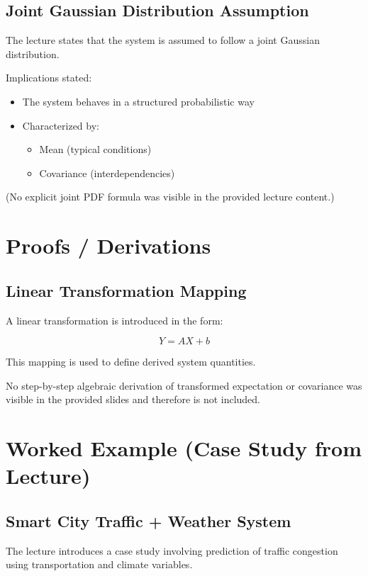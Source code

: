 \documentclass[12pt]{article}
\begin{document}
\subsection*{Joint Gaussian Distribution Assumption}

The lecture states that the system is assumed to follow a joint Gaussian distribution.

Implications stated:

\begin{itemize}
\item The system behaves in a structured probabilistic way
\item Characterized by:
\begin{itemize}
\item Mean (typical conditions)
\item Covariance (interdependencies)
\end{itemize}
\end{itemize}

(No explicit joint PDF formula was visible in the provided lecture content.)

\section*{Proofs / Derivations}

\subsection*{Linear Transformation Mapping}

A linear transformation is introduced in the form:

\[
Y = AX + b
\]

This mapping is used to define derived system quantities.

No step-by-step algebraic derivation of transformed expectation or covariance was visible in the provided slides and therefore is not included.

\section*{Worked Example (Case Study from Lecture)}

\subsection*{Smart City Traffic + Weather System}

The lecture introduces a case study involving prediction of traffic congestion using transportation and climate variables.
\end{document}
